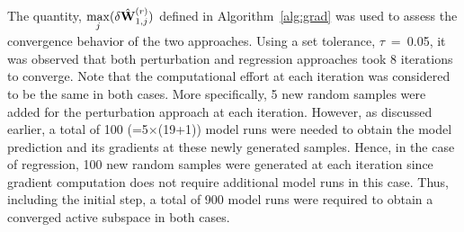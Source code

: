 %
The quantity, $\max\limits_j(\delta \hat{\mathbf{{W}}}_{1,j}^{(r)})$ defined in Algorithm~\ref{alg:grad} was
used to assess the convergence behavior of the two approaches. Using a set tolerance, $\tau$~=~0.05,
it was observed that both perturbation and regression approaches took 8 iterations to converge. 
Note that the computational effort at each iteration was considered to be the same in both cases.
More specifically, 5 new random samples were added for the perturbation approach at each iteration.
However, as discussed earlier, a total of 100 (=5$\times$(19+1)) model runs were needed to obtain the
model prediction and its gradients at these newly generated samples. Hence, in the case of
regression, 100 new random samples were generated at each iteration since gradient computation does
not require additional model runs in this case. Thus, including the initial step, a total of 900
model runs were required to obtain a converged active subspace in both cases. 


